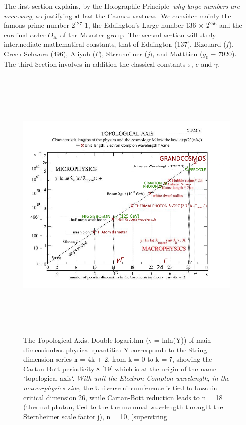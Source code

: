 \documentclass[twoside,draft]{article}
\begin{document}
\begin{sloppypar}
{The first section explains, by the Holographic Principle, \textit{why large numbers are necessary}, so justifying at last the Cosmos vastness. We consider mainly the famous prime number 2$^{127}\!$-1, the Eddington's Large number 136 $\times$ 2$^{256}\!$ and the cardinal order $O_M$ of the Monster group. The second section will study intermediate mathematical constants, that of Eddington (137),  Bizouard ($f$), Green-Schwarz (496), Atiyah ($\Gamma$), Sternheimer ($j$), and Matthieu ($g_0$ = 7920). The third Section involves in addition the classical constants $\pi$, $e$ and $\gamma$. 



\begin{figure}
\centering
\includegraphics[width=\textwidth,height=14cm]{./figures/figure}
\caption{The Topological Axis. Double logarithm (y = lnln(Y)) of main dimensionless physical quantities 
Y corresponds to the String dimension series n = 4k + 2, from k = 0 to k = 7, showing the Cartan-Bott
periodicity 8 [19] which is at the origin of the name `topological axis`. 
\textit{With unit the Electron Compton wavelength, in the macro-physics side}, the Universe circumference 
    is tied to bosonic critical dimension 26, while Cartan-Bott reduction leads to n = 18 (thermal photon, 
    tied to the the mammal wavelength throught the Sternheimer scale factor j), n = 10, (superstring 
}
\end{figure}}
\end{sloppypar}
\end{document}
